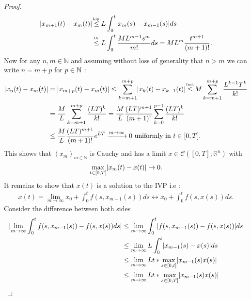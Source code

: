 \begin{proof}[Proof]
  \begin{align*}
    \abs{x_{m+1}(t) - x_{m}(t)} &\myS{Lip.}{\le }  L \int_0^{t} \abs{x_m(s)-x_{m-1}(s)} ds \\
                                &\myS{IA.}{\le } L \int_0^{t} \frac{M L^{m-1} s^{m}  }{m!} ds = ML^{m}  \frac{t^{m+1} }{(m+1)!}
  .\end{align*}
  Now for any $n,m \in  \mathbb{N}$ and assuming without loss of generality that  $n>m$ we can write  $n = m+p$ for $p \in  \mathbb{N}$ : 
  \begin{align*}
    \abs{x_{n}(t) - x_{m}(t)} &= \abs{x_{m+p}(t) - x_{m}(t)} \le  \sum_{k=m+1}^{m+p}  \abs{x_k(t)-x_{k-1}(t)} \myS{Ind.}{\le } M \sum_{k=m+1}^{m+p}  \frac{L^{k-1 }T^{k}  }{k!}\\
                              &= \frac{M}{L} \sum_{k=m+1}^{m+p} \frac{(LT)^{k} }{k!}  = \frac{M}{L} \frac{(LT)^{m+1} }{(m+1)!}\sum_{k=0}^{p-1} \frac{(LT)^{k} }{k!}  \\
                              &\le \frac{M}{L} \frac{(LT)^{m+1} }{(m+1)!} e^{LT}  \xrightarrow{m\to \infty} 0 \text{  uniformly in } t \in  [0,T]
  .\end{align*}
  This shows that $(x_m)_{m \in  \mathbb{N}}$  is Cauchy and has a limit $x \in  \mathcal{C}([0,T];\mathbb{R}^{n} )$ with  
  \begin{align*}
    \max_{t \in  [0,T]} \lvert x_m(t) - x(t)\rvert \to  0
  .\end{align*}
  It remains to show that $x(t)$ is a solution to the IVP i.e : 
  \begin{align*}
    x(t) =  \lim_{m\to \infty} x_0 + \int_0^{t} f(s,x_{m-1}(s)) ds  \leftrightarrow x_0 + \int_0^{t} f(s,x(s)) ds 
  .\end{align*}
  Consider the difference between both sides 
 \begin{align*}
   \abs{\lim_{m \to \infty} \int_0^{t} f(s,x_{m-1}(s))  - f(s,x(s)) ds } &\le  \lim_{m \to  \infty} \int_0^{t} \abs{f(s,x_{m-1}(s))-f(s,x(s))} ds \\
                                                                         &\le  \lim_{m \to \infty} L \int_0^{t} \abs{x_{m-1}(s)-x(s)} ds \\
                                                                         &\le  \lim_{m \to \infty} L t*\max_{s \in [0,t]} \abs{x_{m-1}(s) x(s)}\\
                                                                         &\le   \lim_{m \to \infty} L t*\max_{s \in [0,T]} \abs{x_{m-1}(s) x(s)}\\

\end{align*}
\end{proof}
